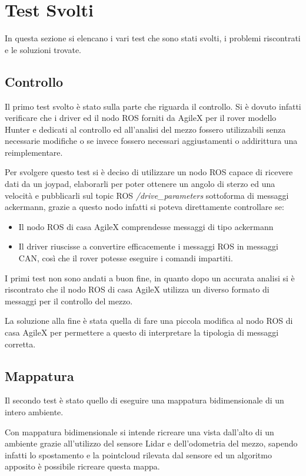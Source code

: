 \section{Test Svolti}
In questa sezione si elencano i vari test che sono stati svolti, i problemi riscontrati e le soluzioni trovate.

\subsection{Controllo}
Il primo test svolto è stato sulla parte che riguarda il controllo. Si è dovuto infatti verificare che i driver ed il nodo ROS forniti da AgileX per il rover modello Hunter e dedicati al controllo ed all'analisi del mezzo fossero utilizzabili senza necessarie modifiche o se invece fossero necessari aggiustamenti o addirittura una reimplementare.

\noindent Per svolgere questo test si è deciso di utilizzare un nodo ROS capace di ricevere dati da un joypad, elaborarli per poter ottenere un angolo di sterzo ed una velocità e pubblicarli sul topic ROS \textit{/drive\_parameters} sottoforma di messaggi ackermann, grazie a questo nodo infatti si poteva direttamente controllare se:

\begin{itemize}
  \item Il nodo ROS di casa AgileX comprendesse messaggi di tipo ackermann
  \item Il driver riuscisse a convertire efficacemente i messaggi ROS in messaggi CAN, così che il rover potesse eseguire i comandi impartiti.
\end{itemize}

\noindent I primi test non sono andati a buon fine, in quanto dopo un accurata analisi si è riscontrato che il nodo ROS di casa AgileX utilizza un diverso formato di messaggi per il controllo del mezzo.

\noindent La soluzione alla fine è stata quella di fare una piccola modifica al nodo ROS di casa AgileX per permettere a questo di interpretare la tipologia di messaggi corretta.

\subsection{Mappatura}
Il secondo test è stato quello di eseguire una mappatura bidimensionale di un intero ambiente.

\noindent Con mappatura bidimensionale si intende ricreare una vista dall'alto di un ambiente grazie all'utilizzo del sensore Lidar e dell'odometria del mezzo, sapendo infatti lo spostamento e la pointcloud rilevata dal sensore ed un algoritmo apposito è possibile ricreare questa mappa.

